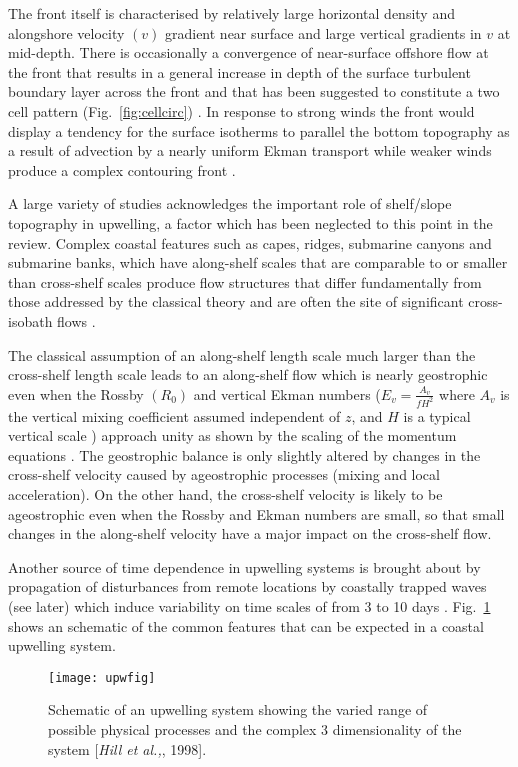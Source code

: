 The front itself is characterised by relatively large horizontal
density and alongshore velocity $(v)$ gradient near surface and
large vertical gradients in $v$ at mid-depth. There is
occasionally a convergence of near-surface offshore flow at the
front that results in a general increase in depth of the surface
turbulent boundary layer across the front \citep{Allen95} and that
has been suggested to constitute a two cell pattern
(Fig.~\ref{fig:cellcirc}) \citep{Chen90}. In response to strong
winds the front would display a tendency for the surface isotherms
to parallel the bottom topography as a result of advection by a
nearly uniform Ekman transport while weaker winds produce a
complex contouring front \citep{Brink83}.

A large variety of studies acknowledges the important role of
shelf/slope topography in upwelling, a factor which has been
neglected to this point in the review. Complex coastal features
such as capes, ridges, submarine canyons and submarine banks,
which have along-shelf scales that are comparable to or smaller
than cross-shelf scales produce flow structures that differ
fundamentally from those addressed by the classical theory and are
often the site of significant cross-isobath flows
\citep{Trowbridge98}.

The classical assumption of an along-shelf length scale much
larger than the cross-shelf length scale leads to an along-shelf
flow which is nearly geostrophic even when the Rossby $(R_0)$ and
vertical Ekman numbers ($E_v=\frac{A_v}{fH^2}$  where $A_v$ is the
vertical mixing coefficient assumed independent of $z$, and $H$ is
a typical vertical scale ) approach unity as shown by the scaling
of the momentum equations \citep{Trowbridge98}. The geostrophic
balance is only slightly altered by changes in the cross-shelf
velocity caused by ageostrophic processes (mixing and local
acceleration). On the other hand, the cross-shelf velocity is
likely to be ageostrophic even when the Rossby and Ekman numbers
are small, so that small changes in the along-shelf velocity have
a major impact on the cross-shelf flow.

Another source of time dependence in upwelling systems is brought
about by propagation of disturbances from remote locations by
coastally trapped waves (see later) which induce variability on
time scales of from 3 to 10 days \citep{Denbo87}.
Fig.~\ref{fig:3dupwdiag} shows an schematic of the common features
that can be expected in a coastal upwelling system.
\begin{figure}
  \centering
  \texttt{[image: upwfig]}
  \caption{Schematic of an upwelling system showing the varied
  range of possible physical processes and the complex 3
  dimensionality of the system
  [{\it Hill et al.,}, 1998].}
  \label{fig:3dupwdiag}
\end{figure}

